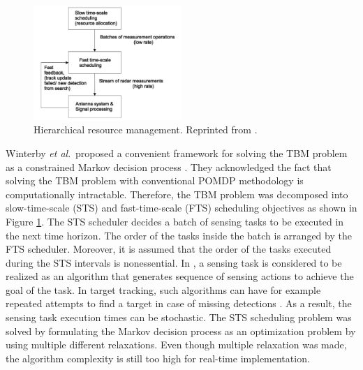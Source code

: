 \documentclass[english, 12pt, a4paper, elec, utf8, a-1b, online]{aaltothesis}
\newcommand{\etal}{\textit{et al}.~}
\begin{document}
\begin{figure}[h]
    \centering
    \includegraphics[width=0.5\textwidth]{figures/two_time_scale.pdf}
    \caption{Hierarchical resource management. Reprinted from \cite{Wintenby2006}.}
    \label{fig:tts_schdeuling}
\end{figure}

Winterby \etal proposed a convenient framework for solving the TBM problem as a constrained Markov decision process \cite{Wintenby2006}.
They acknowledged the fact that solving the TBM problem with conventional POMDP methodology is computationally intractable.
Therefore, the TBM problem was decomposed into slow-time-scale (STS) and fast-time-scale (FTS) scheduling objectives as shown in Figure \ref{fig:tts_schdeuling}.
The STS scheduler decides a batch of sensing tasks to be executed in the next time horizon.
The order of the tasks inside the batch is arranged by the FTS scheduler.
Moreover, it is assumed that the order of the tasks executed during the STS intervals is nonessential.
In \cite{Wintenby2006}, a sensing task is considered to be realized as an algorithm that generates sequence of sensing actions to achieve the goal of the task.
In target tracking, such algorithms can have for example repeated attempts to find a target in case of missing detections \cite{Wintenby2006}.
As a result, the sensing task execution times can be stochastic.
The STS scheduling problem was solved by formulating the Markov decision process as an optimization problem by using multiple different relaxations.
Even though multiple relaxation was made, the algorithm complexity is still too high for real-time implementation.
\end{document}
